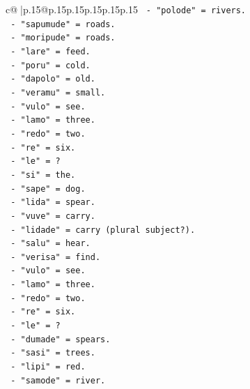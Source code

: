 \documentclass{article}
\begin{document}
{\begin{supertabular}{c@{$\;$}|p{.15\linewidth}@{}p{.15\linewidth}p{.15\linewidth}p{.15\linewidth}p{.15\linewidth}p{.15\linewidth}}
{{{\texttt{                        {-} "polode" = rivers.} \\
\texttt{                        {-} "sapumude" = roads.} \\
\texttt{                        {-} "moripude" = roads.} \\
\texttt{                        {-} "lare" = feed.} \\
\texttt{                        {-} "poru" = cold.} \\
\texttt{                        {-} "dapolo" = old.} \\
\texttt{                        {-} "veramu" = small.} \\
\texttt{                        {-} "vulo" = see.} \\
\texttt{                        {-} "lamo" = three.} \\
\texttt{                        {-} "redo" = two.} \\
\texttt{                        {-} "re" = six.} \\
\texttt{                        {-} "le" = ?} \\
\texttt{                        {-} "si" = the.} \\
\texttt{                        {-} "sape" = dog.} \\
\texttt{                        {-} "lida" = spear.} \\
\texttt{                        {-} "vuve" = carry.} \\
\texttt{                        {-} "lidade" = carry (plural subject?).} \\
\texttt{                        {-} "salu" = hear.} \\
\texttt{                        {-} "verisa" = find.} \\
\texttt{                        {-} "vulo" = see.} \\
\texttt{                        {-} "lamo" = three.} \\
\texttt{                        {-} "redo" = two.} \\
\texttt{                        {-} "re" = six.} \\
\texttt{                        {-} "le" = ?} \\
\texttt{                        {-} "dumade" = spears.} \\
\texttt{                        {-} "sasi" = trees.} \\
\texttt{                        {-} "lipi" = red.} \\
\texttt{                        {-} "samode" = river.} \\
}}}
\end{supertabular}}
\end{document}
